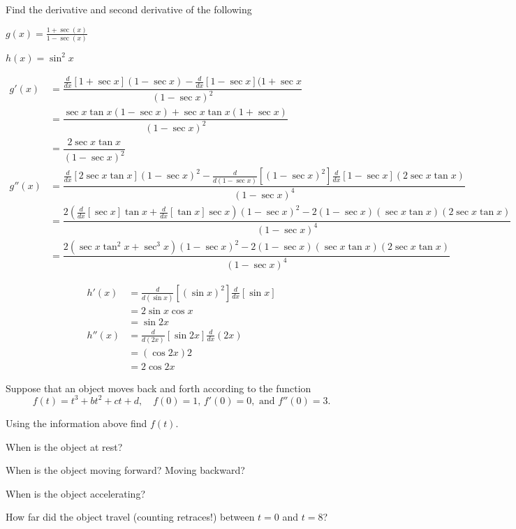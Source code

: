 \documentclass{hwset}
\begin{document}
\begin{problem}[1.] 
	Find the derivative and second derivative of the following
	\be
		\item $g(x) = \frac{1+\sec(x)}{1-\sec(x)}$
		\item $h(x) = \sin^2 x$
	\ee
\end{problem}

\be
	\item
	\begin{solution}
		\begin{align*}
			g'(x) &= \dfrac{\frac{d}{dx}\left[1+\sec x \right](1-\sec x) -
				\frac{d}{dx}\left[1 - \sec x\right](1 + \sec x}{(1 - \sec x)^2} \\
			&= \dfrac{\sec x \tan x (1-\sec x) + \sec x \tan x(1 + \sec x)}{(1 - \sec
				x)^2} \\
			&= \boxed{\dfrac{2\sec x \tan x}{(1 - \sec x)^2}} \\
			g''(x)&= \dfrac{\frac{d}{dx}\left[2\sec x \tan x\right](1 - \sec x)^2 -
				\frac{d}{d(1- \sec x)}\left[(1 - \sec x)^2\right]
				\frac{d}{dx}\left[1-\sec x\right](2\sec x \tan x)}{(1-\sec x)^4} \\
			&= \dfrac{2\left(\frac{d}{dx}\left[\sec x\right]\tan x +
				\frac{d}{dx}\left[\tan x\right] \sec x\right)(1 - \sec x)^2 -
				2(1 - \sec x)(\sec x \tan x)(2\sec x \tan x)}{(1-\sec x)^4} \\
			&= \boxed{\dfrac{2\left(\sec x\tan^2 x + \sec^3 x\right)(1 - \sec x)^2 -
				2(1 - \sec x)(\sec x \tan x)(2\sec x \tan x)}{(1-\sec x)^4}}
		\end{align*}
	\end{solution}
	\item
	\begin{solution}
		\begin{align*}
			h'(x) &= \frac{d}{d(\sin x)}\left[(\sin x)^2\right] \frac{d}{dx}\left[\sin
				x\right] \\
			&= 2\sin x \cos x \\
			&= \boxed{\sin 2 x} \\
			h''(x) & = \frac{d}{d(2x)}\left[\sin 2x\right] \frac{d}{dx}(2x) \\
			&= (\cos 2x) 2 \\
			&= \boxed{2 \cos 2x}
		\end{align*}
	\end{solution}
\ee

\begin{problem}[2.]
	Suppose that an object moves back and forth according to the function
	\begin{equation*}
		f(t)=t^{3}+bt^{2}+ct+d,\quad f(0)=1,\, f'(0)=0, \text{ and } f''(0)=3.
	\end{equation*}
	\be
		\item Using the information above find $f(t)$.
		\item When is the object at rest?
		\item When is the object moving forward? Moving backward?
		\item When is the object accelerating?
		\item	How far did the object travel (counting retraces!) between $t=0$ and
		$t=8$?
	\ee
\end{problem}
\end{document}
